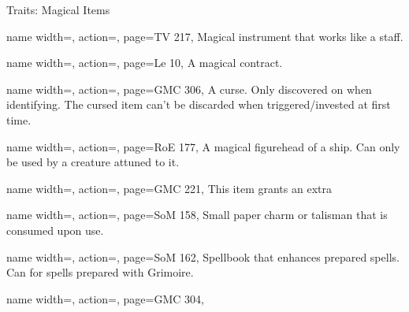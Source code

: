 \begin{PageBack}
\begin{Tables}{\backTableHeight}
\begin{Table}{Traits: Magical Items}
\begin{entry}{}{%
                name width=\conditionLength,%
                action=\Coda,
                page=TV 217,
            }
                Magical instrument that works like a staff.
            \end{entry}
            \begin{entry}{}{%
                name width=\conditionLength,%
                action=\Contract,
                page=Le 10,
            }
                A magical contract.
            \end{entry}
            \begin{entry}{}{%
                name width=\conditionLength,%
                action=\Cursed,
                page=GMC 306,
            }
                A curse. Only discovered on  when identifying.
                The cursed item can't be discarded when triggered/invested at first time.
            \end{entry}
            \begin{entry}{}{%
                name width=\conditionLength,%
                action=\Figurehead,
                page=RoE 177,
            }
                A magical figurehead of a ship. Can only be used by a creature attuned to it. \hfill
            \end{entry}
            \begin{entry}{}{%
                name width=\conditionLength,%
                action=\Focused,
                page=GMC 221,
            }
                This item grants an extra  \hfill{}
            \end{entry}
            \begin{entry}{}{%
                name width=\conditionLength,%
                action=\Fulu,
                page=SoM 158,
            }
                Small paper charm or talisman that is consumed upon use.
            \end{entry}
            \begin{entry}{}{%
                name width=\conditionLength,%
                action=\Grimoire,
                page=SoM 162,
            }
                Spellbook that enhances prepared spells. Can  for spells prepared with Grimoire. \hfill
            \end{entry}
            \begin{entry}{}{%
                name width=\conditionLength,%
                action=\Intelligent,
                page=GMC 304,
            }

\end{entry}
\end{Table}
\end{Tables}
\end{PageBack}
